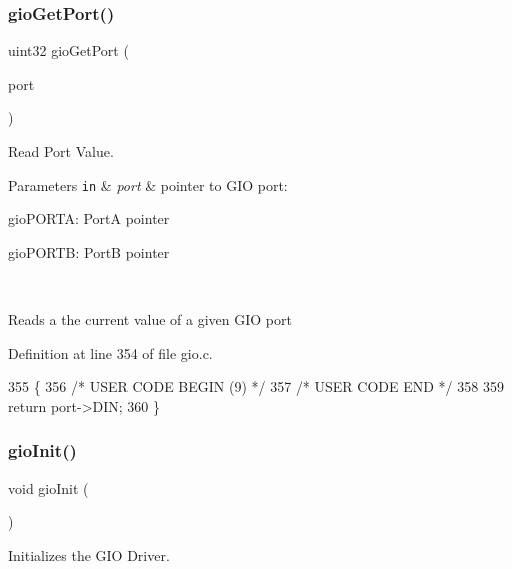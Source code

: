 \subsubsection{\texorpdfstring{gio\+Get\+Port()}{gioGetPort()}}
{\footnotesize\ttfamily uint32 gio\+Get\+Port (\begin{DoxyParamCaption}\item[{\mbox{\hyperlink{reg__gio_8h_ad276ab0b3bc4719e20bc91adf2bfcfe7}{gio\+P\+O\+R\+T\+\_\+t}} $\ast$}]{port }\end{DoxyParamCaption})}



Read Port Value. 


\begin{DoxyParams}[1]{Parameters}
\mbox{\tt in}  & {\em port} & pointer to G\+IO port\+:
\begin{DoxyItemize}
\item gio\+P\+O\+R\+TA\+: PortA pointer
\item gio\+P\+O\+R\+TB\+: PortB pointer
\end{DoxyItemize}\\
\hline
\end{DoxyParams}
Reads a the current value of a given G\+IO port 

Definition at line 354 of file gio.\+c.


\begin{DoxyCode}
355 \{
356 \textcolor{comment}{/* USER CODE BEGIN (9) */}
357 \textcolor{comment}{/* USER CODE END */}
358 
359     \textcolor{keywordflow}{return} port->DIN;
360 \}
\end{DoxyCode}
\mbox{\label{group__GIO_ga3a5c5cc04b0105eb43cf8f5556e8207e}} 
\subsubsection{\texorpdfstring{gio\+Init()}{gioInit()}}
{\footnotesize\ttfamily void gio\+Init (\begin{DoxyParamCaption}\item[{void}]{ }\end{DoxyParamCaption})}



Initializes the G\+IO Driver. 

